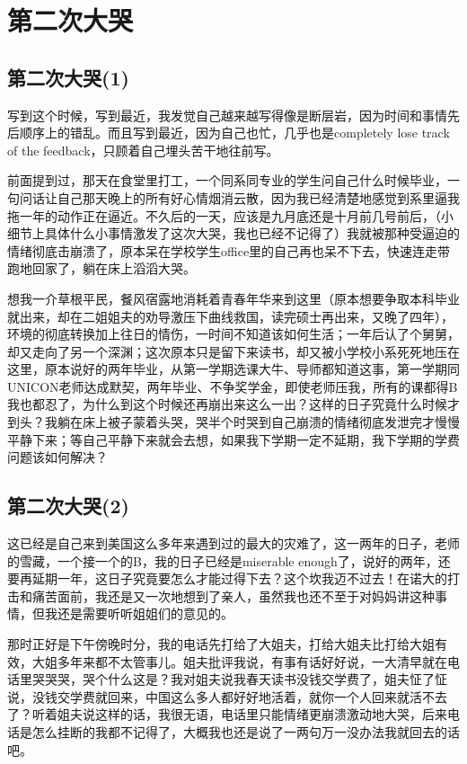 \documentclass[12pt]{book}
\begin{document}
\chapter{第二次大哭}
\label{sec-20}
\section{第二次大哭(1)}
\label{sec-20-1}

写到这个时候，写到最近，我发觉自己越来越写得像是断层岩，因为时间和事情先后顺序上的错乱。而且写到最近，因为自己也忙，几乎也是completely lose track of the feedback，只顾着自己埋头苦干地往前写。

前面提到过，那天在食堂里打工，一个同系同专业的学生问自己什么时候毕业，一句问话让自己那天晚上的所有好心情烟消云散，因为我已经清楚地感觉到系里逼我拖一年的动作正在逼近。不久后的一天，应该是九月底还是十月前几号前后，（小细节上具体什么小事情激发了这次大哭，我也已经不记得了）我就被那种受逼迫的情绪彻底击崩溃了，原本呆在学校学生office里的自己再也呆不下去，快速连走带跑地回家了，躺在床上滔滔大哭。

想我一介草根平民，餐风宿露地消耗着青春年华来到这里（原本想要争取本科毕业就出来，却在二姐姐夫的劝导激压下曲线救国，读完硕士再出来，又晚了四年），环境的彻底转换加上往日的情伤，一时间不知道该如何生活；一年后认了个舅舅，却又走向了另一个深渊；这次原本只是留下来读书，却又被小学校小系死死地压在这里，原本说好的两年毕业，从第一学期选课大牛、导师都知道这事，第一学期同UNICON老师达成默契，两年毕业、不争奖学金，即使老师压我，所有的课都得B我也都忍了，为什么到这个时候还再崩出来这么一出？这样的日子究竟什么时候才到头？我躺在床上被子蒙着头哭，哭半个时哭到自己崩溃的情绪彻底发泄完才慢慢平静下来；等自己平静下来就会去想，如果我下学期一定不延期，我下学期的学费问题该如何解决？

\section{第二次大哭(2)}
\label{sec-20-2}

这已经是自己来到美国这么多年来遇到过的最大的灾难了，这一两年的日子，老师的雪藏，一个接一个的B，我的日子已经是miserable enough了，说好的两年，还要再延期一年，这日子究竟要怎么才能过得下去？这个坎我迈不过去！在诺大的打击和痛苦面前，我还是又一次地想到了亲人，虽然我也还不至于对妈妈讲这种事情，但我还是需要听听姐姐们的意见的。

那时正好是下午傍晚时分，我的电话先打给了大姐夫，打给大姐夫比打给大姐有效，大姐多年来都不太管事儿。姐夫批评我说，有事有话好好说，一大清早就在电话里哭哭哭，哭个什么这是？我对姐夫说我春天读书没钱交学费了，姐夫怔了怔说，没钱交学费就回来，中国这么多人都好好地活着，就你一个人回来就活不去了？听着姐夫说这样的话，我很无语，电话里只能情绪更崩溃激动地大哭，后来电话是怎么挂断的我都不记得了，大概我也还是说了一两句万一没办法我就回去的话吧。
\end{document}
